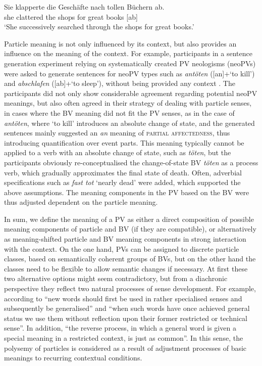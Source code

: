 \documentclass[output=paper]{langsci/langscibook}
\begin{document}
\ea\label{ex:abklappern}
\gll Sie klapperte die Geschäfte nach tollen Büchern ab.\\
she clattered the shops for great books [ab]\\
\glt `She successively searched through the shops for great books.'
\z

Particle meaning is not only influenced by its context, but also
provides an influence on the meaning of the context. For example,
participants in a sentence generation experiment relying on
systematically created PV neologisms (neoPVs) were asked to generate
sentences for neoPV types such as \textit{antöten} ([an]+`to kill')
and \textit{abschlafen} ([ab]+`to sleep'), without being provided any
context \citep{SpringorumEtAl:13c}. The participants did not only
show considerable agreement regarding potential neoPV meanings, but
also often agreed in their strategy of dealing with particle senses,
in cases where the BV meaning did not fit the PV senses, as in the
case of \textit{antöten}, where `to kill' introduces an absolute
change of state, and the generated sentences mainly suggested an
\textit{an} meaning of \textsc{partial affectedness}, thus introducing
quantification over event parts. This meaning typically cannot be
applied to a verb with an absolute change of state, such as
\textit{töten}, but the participants obviously re-conceptualised the
change-of-state BV \textit{töten} as a process verb, which gradually
approximates the final state of death. Often, adverbial specifications
such as \textit{fast tot} `nearly dead' were added, which supported
the above assumptions. The meaning components in the PV based on the
BV were thus adjusted dependent on the particle meaning.

In sum, we define the meaning of a PV as either a direct composition
of possible meaning components of particle and BV (if they are
compatible), or alternatively as meaning-shifted particle and BV
meaning components in strong interaction with the context. On the one
hand, PVs can be assigned to discrete particle classes, based on
semantically coherent groups of BVs, but on the other hand the classes
need to be flexible to allow semantic changes if necessary. At first
these two alternative options might seem contradictory, but from a
diachronic perspective they reflect two natural processes of sense
development. For example, according to \cite{Waldron:79} ``new words
should first be used in rather specialised senses and subsequently be
generalised'' and ``when such words have once achieved general status
we use them without reflection upon their former restricted or
technical sense''. In addition, ``the reverse process, in which a
general word is given a special meaning in a restricted context, is
just as common''. In this sense, the polysemy of particles is
considered as a result of adjustment processes of basic meanings to
recurring contextual conditions.
\end{document}
